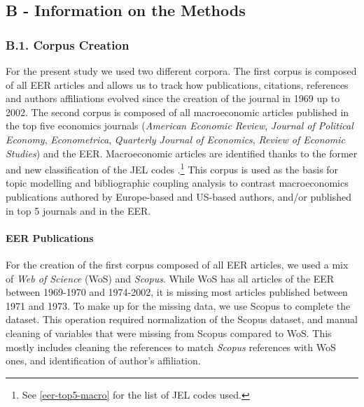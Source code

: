 \documentclass[]{elsarticle} %
\begin{document}
\newpage

\hypertarget{appendix}{%
\subsection*{B - Information on the Methods}\label{appendix}}

\hypertarget{corpus}{%
\subsubsection*{B.1. Corpus Creation}\label{corpus}}

For the present study we used two different corpora. The first corpus is
composed of all EER articles and allows us to track how publications,
citations, references and authors affiliations evolved since the
creation of the journal in 1969 up to 2002. The second corpus is
composed of all macroeconomic articles published in the top five
economics journals (\emph{American Economic Review}, \emph{Journal of
Political Economy}, \emph{Econometrica}, \emph{Quarterly Journal of
Economics}, \emph{Review of Economic Studies}) and the EER.
Macroeconomic articles are identified thanks to the former and new
classification of the JEL codes \citep{jel1991}.\footnote{See
  \ref{eer-top5-macro} for the list of JEL codes used.} This corpus is
used as the basis for topic modelling and bibliographic coupling
analysis to contrast macroeconomics publications authored by
Europe-based and US-based authors, and/or published in top 5 journals
and in the EER.

\hypertarget{eer-publications}{%
\paragraph*{EER Publications}\label{eer-publications}}

For the creation of the first corpus composed of all EER articles, we
used a mix of \emph{Web of Science} (WoS) and \emph{Scopus}. While WoS
has all articles of the EER between 1969-1970 and 1974-2002, it is
missing most articles published between 1971 and 1973. To make up for
the missing data, we use Scopus to complete the dataset. This operation
required normalization of the Scopus dataset, and manual cleaning of
variables that were missing from Scopus compared to WoS. This mostly
includes cleaning the references to match \emph{Scopus} references with
WoS ones, and identification of author's affiliation.
\end{document}
